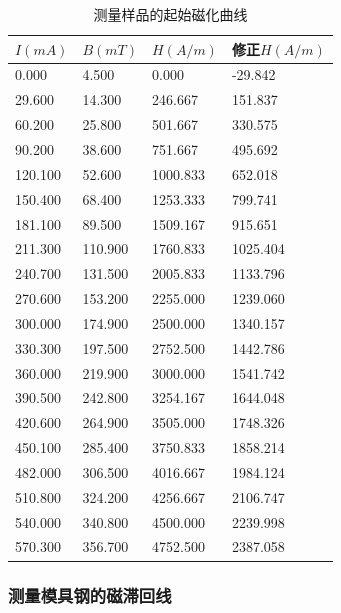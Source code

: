 \documentclass[zihao=5, UTF8]{article}
\theoremstyle{MyLineTheoremStyle} %
\theoremstyle{MyBlockTheoremStyle} %
\theoremstyle{MySubsubsectionStyle} %
\begin{document}
\begin{table}[H]
  \centering
  \caption{测量样品的起始磁化曲线}\label{测量样品的起始磁化曲线}
        \begin{tabularx}{\textwidth}{|X|X|X|X|}
        \hline
        $I(mA)$ & $B(mT)$ & $H(A/m)$ & 修正$H(A/m)$ \\
        \hline
        0.000 & 4.500 & 0.000 & -29.842 \\
        \hline
        29.600 & 14.300 & 246.667 & 151.837 \\
        \hline
        60.200 & 25.800 & 501.667 & 330.575 \\
        \hline
        90.200 & 38.600 & 751.667 & 495.692 \\
        \hline
        120.100 & 52.600 & 1000.833 & 652.018 \\
        \hline
        150.400 & 68.400 & 1253.333 & 799.741 \\
        \hline
        181.100 & 89.500 & 1509.167 & 915.651 \\
        \hline
        211.300 & 110.900 & 1760.833 & 1025.404 \\
        \hline
        240.700 & 131.500 & 2005.833 & 1133.796 \\
        \hline
        270.600 & 153.200 & 2255.000 & 1239.060 \\
        \hline
        300.000 & 174.900 & 2500.000 & 1340.157 \\
        \hline
        330.300 & 197.500 & 2752.500 & 1442.786 \\
        \hline
        360.000 & 219.900 & 3000.000 & 1541.742 \\
        \hline
        390.500 & 242.800 & 3254.167 & 1644.048 \\
        \hline
        420.600 & 264.900 & 3505.000 & 1748.326 \\
        \hline
        450.100 & 285.400 & 3750.833 & 1858.214 \\
        \hline
        482.000 & 306.500 & 4016.667 & 1984.124 \\
        \hline
        510.800 & 324.200 & 4256.667 & 2106.747 \\
        \hline
        540.000 & 340.800 & 4500.000 & 2239.998 \\
        \hline
        570.300 & 356.700 & 4752.500 & 2387.058 \\
        \hline
        \end{tabularx}
\end{table}

\subsubsection{测量模具钢的磁滞回线}
\end{document}
